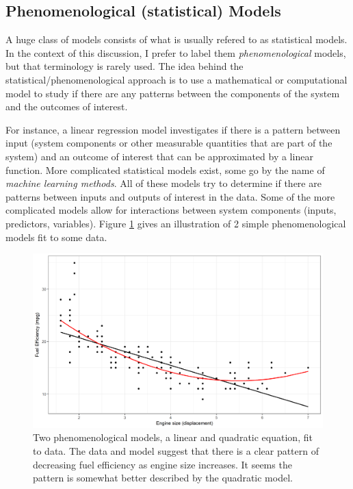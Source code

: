 \documentclass[]{book}
\theoremstyle{definition}
\theoremstyle{definition}
\theoremstyle{definition}
\theoremstyle{remark}
\begin{document}
\subsection{Phenomenological (statistical)
Models}\label{phenomenological-statistical-models}

A huge class of models consists of what is usually refered to as
statistical models. In the context of this discussion, I prefer to label
them \emph{phenomenological} models, but that terminology is rarely
used. The idea behind the statistical/phenomenological approach is to
use a mathematical or computational model to study if there are any
patterns between the components of the system and the outcomes of
interest.

For instance, a linear regression model investigates if there is a
pattern between input (system components or other measurable quantities
that are part of the system) and an outcome of interest that can be
approximated by a linear function. More complicated statistical models
exist, some go by the name of \emph{machine learning methods}. All of
these models try to determine if there are patterns between inputs and
outputs of interest in the data. Some of the more complicated models
allow for interactions between system components (inputs, predictors,
variables). Figure \ref{fig:phenomodel} gives an illustration of 2
simple phenomenological models fit to some data.

\begin{figure}
\centering
\includegraphics{./images/phenomodel.png}
\caption{\label{fig:phenomodel}Two phenomenological models, a linear and
quadratic equation, fit to data. The data and model suggest that there
is a clear pattern of decreasing fuel efficiency as engine size
increases. It seems the pattern is somewhat better described by the
quadratic model.}
\end{figure}
\end{document}
